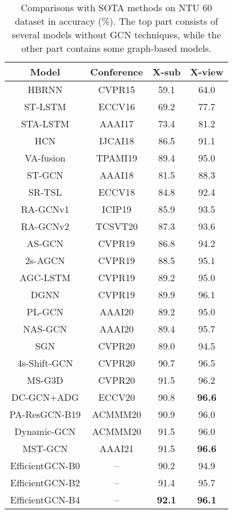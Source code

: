 \documentclass[10pt,journal,compsoc]{IEEEtran}
\begin{document}
\begin{table}[t]
  \caption{Comparisons with SOTA methods on NTU 60 dataset in accuracy (\%). The top part consists of several models without GCN techniques, while the other part contains some graph-based models.}
  \label{tab:ntu60}
  \vspace{-0.4cm}
  \centering
  \setlength{\tabcolsep}{4pt}
  \renewcommand{\arraystretch}{1.2}
  \begin{tabular}{cc|cc}
  \toprule
  Model & Conference & X-sub & X-view \\
  \midrule
  HBRNN \cite{du2015hierarchical} & CVPR15 & 59.1 & 64.0 \\
  ST-LSTM \cite{liu2016spatio} & ECCV16 & 69.2 & 77.7 \\
  STA-LSTM \cite{song2017end} & AAAI17 & 73.4 & 81.2 \\
  HCN \cite{li2018co} & IJCAI18 & 86.5 & 91.1 \\
  VA-fusion \cite{zhang2019view} & TPAMI19 & 89.4 & 95.0 \\
  \midrule
  ST-GCN \cite{yan2018spatial} & AAAI18 & 81.5 & 88.3 \\
  SR-TSL \cite{si2018skeleton} & ECCV18 & 84.8 & 92.4 \\
  RA-GCNv1 \cite{song2019richly} & ICIP19 & 85.9 & 93.5 \\
  RA-GCNv2 \cite{song2020richly} & TCSVT20 & 87.3 & 93.6 \\
  AS-GCN \cite{li2019actional} & CVPR19 & 86.8 & 94.2 \\
  2s-AGCN \cite{shi2019two} & CVPR19 & 88.5 & 95.1 \\
  AGC-LSTM \cite{si2019attention} & CVPR19 & 89.2 & 95.0 \\
  DGNN \cite{shi2019skeleton} & CVPR19 & 89.9 & 96.1 \\
  PL-GCN \cite{huang2020part} & AAAI20 & 89.2 & 95.0 \\
  NAS-GCN \cite{peng2020learning} & AAAI20 & 89.4 & 95.7 \\
  SGN \cite{zhang2020semantics} & CVPR20 & 89.0 & 94.5 \\
  4s-Shift-GCN \cite{cheng2020skeleton} & CVPR20 & 90.7 & 96.5 \\
  MS-G3D \cite{liu2020disentangling} & CVPR20 & 91.5 & 96.2 \\
  DC-GCN+ADG \cite{cheng2020decoupling} & ECCV20 & 90.8 & {\bf 96.6} \\
  PA-ResGCN-B19 \cite{song2020stronger} & ACMMM20 & 90.9 & 96.0 \\
  Dynamic-GCN \cite{ye2020dynamic} & ACMMM20 & 91.5 & 96.0 \\
  MST-GCN \cite{chen2021multi} & AAAI21 & 91.5 & {\bf 96.6} \\
  \midrule
  EfficientGCN-B0 & -- & 90.2 & 94.9 \\
  EfficientGCN-B2 & -- & 91.4 & 95.7 \\
  EfficientGCN-B4 & -- & {\bf 92.1} & {\bf 96.1} \\
  \bottomrule
  \end{tabular}
\end{table}
\end{document}
